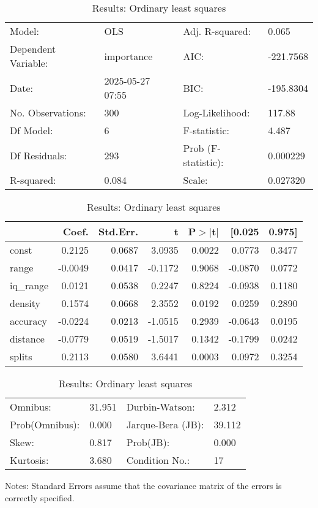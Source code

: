 \begin{table}
\caption{Results: Ordinary least squares}
\label{}
\begin{center}
\begin{tabular}{llll}
\hline
Model:              & OLS              & Adj. R-squared:     & 0.065      \\
Dependent Variable: & importance       & AIC:                & -221.7568  \\
Date:               & 2025-05-27 07:55 & BIC:                & -195.8304  \\
No. Observations:   & 300              & Log-Likelihood:     & 117.88     \\
Df Model:           & 6                & F-statistic:        & 4.487      \\
Df Residuals:       & 293              & Prob (F-statistic): & 0.000229   \\
R-squared:          & 0.084            & Scale:              & 0.027320   \\
\hline
\end{tabular}
\end{center}

\begin{center}
\begin{tabular}{lrrrrrr}
\hline
          &   Coef. & Std.Err. &       t & P$> |$t$|$ &  [0.025 & 0.975]  \\
\hline
const     &  0.2125 &   0.0687 &  3.0935 &      0.0022 &  0.0773 & 0.3477  \\
range     & -0.0049 &   0.0417 & -0.1172 &      0.9068 & -0.0870 & 0.0772  \\
iq\_range &  0.0121 &   0.0538 &  0.2247 &      0.8224 & -0.0938 & 0.1180  \\
density   &  0.1574 &   0.0668 &  2.3552 &      0.0192 &  0.0259 & 0.2890  \\
accuracy  & -0.0224 &   0.0213 & -1.0515 &      0.2939 & -0.0643 & 0.0195  \\
distance  & -0.0779 &   0.0519 & -1.5017 &      0.1342 & -0.1799 & 0.0242  \\
splits    &  0.2113 &   0.0580 &  3.6441 &      0.0003 &  0.0972 & 0.3254  \\
\hline
\end{tabular}
\end{center}

\begin{center}
\begin{tabular}{llll}
\hline
Omnibus:       & 31.951 & Durbin-Watson:    & 2.312   \\
Prob(Omnibus): & 0.000  & Jarque-Bera (JB): & 39.112  \\
Skew:          & 0.817  & Prob(JB):         & 0.000   \\
Kurtosis:      & 3.680  & Condition No.:    & 17      \\
\hline
\end{tabular}
\end{center}
\end{table}
\bigskip
Notes: \newline 
[1] Standard Errors assume that the covariance matrix of the errors is correctly specified.